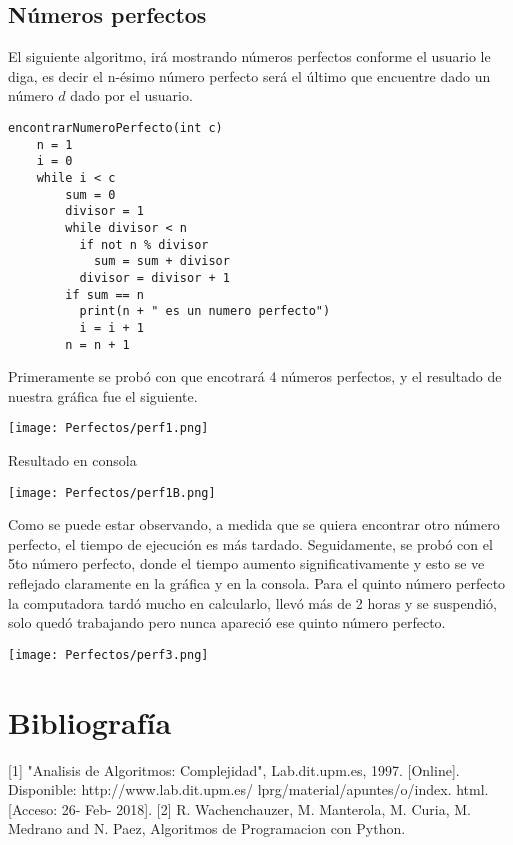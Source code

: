 \documentclass[12pt,twoside]{article}
\begin{document}
\subsection{Números perfectos}
El siguiente algoritmo, irá mostrando números perfectos conforme el usuario le diga, es decir el n-ésimo número perfecto será el último que encuentre dado un número $d$ dado por el usuario.
\begin{lstlisting}
encontrarNumeroPerfecto(int c)
    n = 1
    i = 0
    while i < c
        sum = 0
        divisor = 1
        while divisor < n
          if not n % divisor
            sum = sum + divisor
          divisor = divisor + 1
        if sum == n
          print(n + " es un numero perfecto")
          i = i + 1
        n = n + 1
\end{lstlisting}
Primeramente se probó con que encotrará 4 números perfectos, y el resultado de nuestra gráfica fue el siguiente.
\begin{center}
    \texttt{[image: Perfectos/perf1.png]}
\end{center}
Resultado en consola
\begin{center}
    \texttt{[image: Perfectos/perf1B.png]}
\end{center}
Como se puede estar observando, a medida que se quiera encontrar otro número perfecto, el tiempo de ejecución es más tardado.\newline
Seguidamente, se probó con el 5to número perfecto, donde el tiempo aumento significativamente y esto se ve reflejado claramente en la gráfica y en la consola.\newline
Para el quinto número perfecto la computadora tardó mucho en calcularlo, llevó más de 2 horas y se suspendió, solo quedó trabajando pero nunca apareció ese quinto número perfecto.
\begin{center}
    \texttt{[image: Perfectos/perf3.png]}
\end{center}
\section{Bibliograf\'ia}
[1] "An\´alisis de Algoritmos: Complejidad", Lab.dit.upm.es, 1997. [Online].
Disponible: http://www.lab.dit.upm.es/ lprg/material/apuntes/o/index.
html. [Acceso: 26- Feb- 2018].
[2] R. Wachenchauzer, M. Manterola, M. Curia, M. Medrano and N. Paez, Algoritmos de Programaci\´on con Python.
\end{document}
